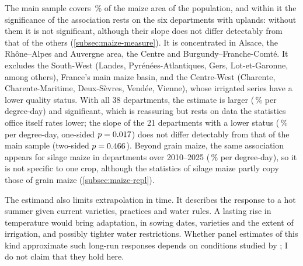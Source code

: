 The main sample covers \MainShareArea\,\% of the maize area of the population, and within it the significance of the association rests on the six departments with uplands: without them it is not significant, although their slope does not differ detectably from that of the others (\cref{subsec:maize-measure}). It is concentrated in Alsace, the Rhône--Alpes and Auvergne area, the Centre and Burgundy--Franche-Comté. It excludes the South-West (Landes, Pyrénées-Atlantiques, Gers, Lot-et-Garonne, among others), France's main maize basin, and the Centre-West (Charente, Charente-Maritime, Deux-Sèvres, Vendée, Vienne), whose irrigated series have a lower quality status. With all 38 departments, the estimate is larger (\QoneAllDepsPct\,\% per degree-day) and significant, which is reassuring but rests on data the statistics office itself rates lower; the slope of the 21 departments with a lower status (\StatusTwoPct\,\% per degree-day, one-sided $p = 0.017$) does not differ detectably from that of the main sample (two-sided $p = 0.466$). Beyond grain maize, the same association appears for silage maize in \FodderDeps{} departments over 2010--2025 (\FodderPct\,\% per degree-day), so it is not specific to one crop, although the statistics of silage maize partly copy those of grain maize (\cref{subsec:maize-repl}).

The estimand also limits extrapolation in time. It describes the response to a hot summer given current varieties, practices and water rules. A lasting rise in temperature would bring adaptation, in sowing dates, varieties and the extent of irrigation, and possibly tighter water restrictions. Whether panel estimates of this kind approximate such long-run responses depends on conditions studied by \textcite{merel2021}; I do not claim that they hold here.

